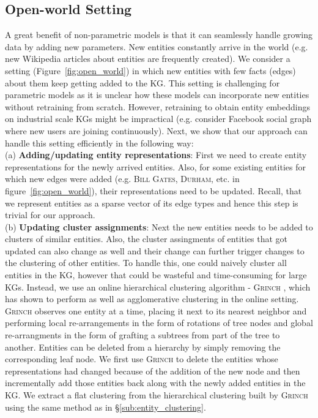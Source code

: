 \documentclass[11pt,a4paper]{article}
\newcommand{\grinch}{\textsc{Grinch}\xspace}
\begin{document}
\subsection{Open-world Setting}
\label{sub:open_world}
A great benefit of non-parametric models is that it can seamlessly handle growing data by adding new parameters. New entities constantly arrive in the world (e.g. new Wikipedia articles about entities are frequently created). We consider a setting (Figure~\ref{fig:open_world}) in which new entities with few facts (edges) about them keep getting added to the KG. This setting is challenging for parametric models \cite{das2018go,sun2019rotate} as it is unclear how these models can incorporate new entities without retraining from scratch. However, retraining to obtain entity embeddings on industrial scale KGs might be impractical (e.g. consider Facebook social graph where new users are joining continuously). Next, we show that our approach can handle this setting efficiently in the following way:\\
(a) \textbf{Adding/updating entity representations}: First we need to create entity representations for the newly arrived entities. Also, for some existing entities for which new edges were added (e.g. \textsc{Bill Gates}, \textsc{Durham}, etc. in figure~\ref{fig:open_world}), their representations need to be updated. Recall, that we represent entities as a sparse vector of its edge types and hence this step is trivial for our approach.\\
(b) \textbf{Updating cluster assignments}: Next the new entities needs to be added to clusters of similar entities. Also, the cluster assingments of entities that got updated can also change as well and their change can further trigger changes to the clustering of other entities. To handle this, one could naively cluster all entities in the KG, however that could be wasteful and time-consuming for large KGs. Instead, we use an online hierarchical clustering algorithm - \textsc{Grinch} \cite{monath2019scalable}, which has shown to perform as well as agglomerative clustering in the online setting. \textsc{Grinch} observes one entity at a time, placing it next to its nearest neighbor and performing local re-arrangements in the form of rotations of tree nodes and global re-arrangments in the form of grafting a subtrees from part of the tree to another. Entities can be deleted from a hierarchy by simply removing the corresponding leaf node. We first use \grinch to delete the entities whose representations had changed because of the addition of the new node and then incrementally add those entities back along with the newly added entities in the KG. We extract a flat clustering from the hierarchical clustering built by \textsc{Grinch} using the same method as in \S\ref{sub:entity_clustering}.\\
\end{document}
